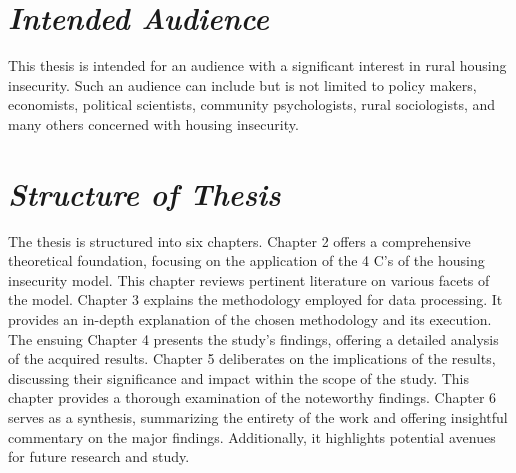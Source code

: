 \section{\textit{Intended Audience}}
This thesis is intended for an audience with a significant interest in rural housing insecurity. Such an audience can include but is not limited to policy makers, economists, political scientists, community psychologists, rural sociologists, and many others concerned with housing insecurity. 

\section{\textit{Structure of Thesis}}
The thesis is structured into six chapters. Chapter 2 offers a comprehensive theoretical foundation, focusing on the application of the 4 C's of the housing insecurity model. This chapter reviews pertinent literature on various facets of the model. Chapter 3 explains the methodology employed for data processing. It provides an in-depth explanation of the chosen methodology and its execution. The ensuing Chapter 4 presents the study's findings, offering a detailed analysis of the acquired results. Chapter 5 deliberates on the implications of the results, discussing their significance and impact within the scope of the study. This chapter provides a thorough examination of the noteworthy findings. Chapter 6 serves as a synthesis, summarizing the entirety of the work and offering insightful commentary on the major findings. Additionally, it highlights potential avenues for future research and study.

\endinput